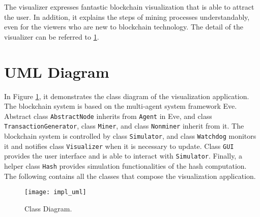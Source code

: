 The visualizer expresses fantastic blockchain visualization that is able to attract the user. In addition, it explains the steps of mining processes understandably, even for the viewers who are new to blockchain technology. The detail of the visualizer can be referred to \ref{sec:uml diagram}.

\section{UML Diagram}
\label{sec:uml diagram}

In Figure \ref{fig:class diagram}, it demonstrates the class diagram of the visualization application. The blockchain system is based on the multi-agent system framework Eve. Abstract class \texttt{AbstractNode} inherits from \texttt{Agent} in Eve, and class \texttt{TransactionGenerator}, class \texttt{Miner}, and class \texttt{Nonminer} inherit from it. The blockchain system is controlled by class \texttt{Simulator}, and class \texttt{Watchdog} monitors it and notifies class \texttt{Visualizer} when it is necessary to update. Class \texttt{GUI} provides the user interface and is able to interact with \texttt{Simulator}. Finally, a helper class \texttt{Hash} provides simulation functionalities of the hash computation. The following contains all the classes that compose the visualization application.

\clearpage

\vspace*{\fill}
\begin{figure}[!ht]
    \centering
    \texttt{[image: impl\_uml]}
    \caption{Class Diagram.}
    \label{fig:class diagram}
\end{figure}
\vspace*{\fill}

\clearpage

